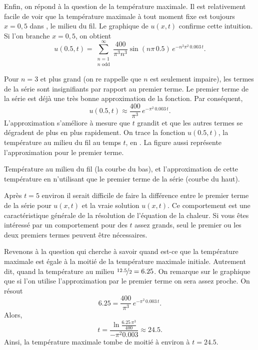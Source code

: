 \begin{example}
Enfin,  on répond à la question de la température maximale.  Il est
relativement facile de voir
que la température maximale à tout moment fixe est toujours $ x = 0,5 $ dans ,
le milieu du fil.  Le graphique de $ u (x, t) $ confirme cette intuition.
Si l'on branche $ x = 0,5 $,  on obtient
\begin{equation*}
u(0.5,t) = 
\sum_{\substack{n=1 \\ n \text{ odd}}}^\infty
\frac{400}{\pi^3 n^3}
\sin (n \pi\, 0.5 )
\, e^{-n^2 \pi^2 \, 0.003 \, t} .
\end{equation*}

Pour $n=3$ et plus grand (on re rappelle que $n$ est seulement impaire),  les termes
de la série
sont insignifiants par rapport au premier terme.
Le premier terme de la série est déjà une très bonne approximation
de la fonction.
Par conséquent,
\begin{equation*}
u(0.5,t) \approx
\frac{400}{\pi^3}
\, e^{-\pi^2 \, 0.003 \, t} .
\end{equation*}
L'approximation s'améliore à mesure que $ t $ grandit et que les autres
termes se dégradent de plus en plus rapidement.
On trace la fonction $ u (0.5, t) $,  la température au milieu du fil
au temps $ t $,  en .  La figure aussi
représente l'approximation pour le premier terme.

\begin{myfig}
\capstart
{}
\caption{Température au milieu du fil (la courbe du bas),
et l'approximation de cette température en n'utilisant que le premier terme de
la série (courbe du haut). \label{heat:wireexmaxfig}}
\end{myfig}

Après $ t = 5 $ environ
il serait difficile de faire la différence
entre le premier terme de la série pour $ u (x, t) $ et
la vraie solution $ u (x, t) $.  Ce comportement
est une caractéristique générale de la résolution de l'équation de la chaleur.
Si vous êtes intéressé par un comportement pour des $ t $ assez grands,  seul le
premier ou les deux premiers termes peuvent être nécessaires.


Revenons à la question qui cherche à savoir quand est-ce que la température maximale est égale à la moitié de la
température maximale initiale.  Autrement dit,  quand la température
au milieu $\nicefrac{12.5}{2} = 6.25$.  On remarque sur le graphique que si l'on utilise
l'approximation par le premier terme on sera assez proche.  On résout 
\begin{equation*}
6.25 =
\frac{400}{\pi^3}
\, e^{-\pi^2 \, 0.003 \, t} .
\end{equation*}
Alors,
\begin{equation*}
t =
\frac{\ln \frac{6.25\,\pi^3}{400}}{-\pi^2 0.003}
\approx 24.5 .
\end{equation*}
Ainsi, la température maximale tombe de moitié à environ à $t=24.5$.
\end{example}


